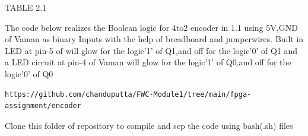 \documentclass[10pt, a4paper]{article}
\begin{document}
\begin{center}
TABLE 2.1
\end{center}

The code below realizes the Boolean logic for 4to2 encoder in 1.1  using 5V,GND of Vaman as binary Inputs with the help of breadboard and jumperwires.
Built in LED at pin-5 of  will glow for the logic'1' of Q1,and off for the logic'0' of Q1  and a LED circuit at pin-4 of Vaman will glow for the logic'1' of Q0,and off for the logic'0' of Q0
\begin{lstlisting}
https://github.com/chanduputta/FWC-Module1/tree/main/fpga-assignment/encoder
\end{lstlisting}
Clone this folder of repository to compile and scp the code using bash(.sh) files 

\end{document}
